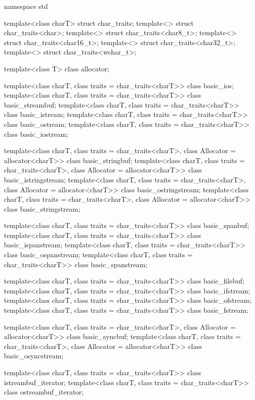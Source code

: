 \begin{codeblock}
namespace std {
  template<class charT> struct char_traits;
  template<> struct char_traits<char>;
  template<> struct char_traits<char8_t>;
  template<> struct char_traits<char16_t>;
  template<> struct char_traits<char32_t>;
  template<> struct char_traits<wchar_t>;

  template<class T> class allocator;

  template<class charT, class traits = char_traits<charT>>
    class basic_ios;
  template<class charT, class traits = char_traits<charT>>
    class basic_streambuf;
  template<class charT, class traits = char_traits<charT>>
    class basic_istream;
  template<class charT, class traits = char_traits<charT>>
    class basic_ostream;
  template<class charT, class traits = char_traits<charT>>
    class basic_iostream;

  template<class charT, class traits = char_traits<charT>,
           class Allocator = allocator<charT>>
    class basic_stringbuf;
  template<class charT, class traits = char_traits<charT>,
           class Allocator = allocator<charT>>
    class basic_istringstream;
  template<class charT, class traits = char_traits<charT>,
           class Allocator = allocator<charT>>
    class basic_ostringstream;
  template<class charT, class traits = char_traits<charT>,
           class Allocator = allocator<charT>>
    class basic_stringstream;

  template<class charT, class traits = char_traits<charT>>
    class basic_spanbuf;
  template<class charT, class traits = char_traits<charT>>
    class basic_ispanstream;
  template<class charT, class traits = char_traits<charT>>
    class basic_ospanstream;
  template<class charT, class traits = char_traits<charT>>
    class basic_spanstream;

  template<class charT, class traits = char_traits<charT>>
    class basic_filebuf;
  template<class charT, class traits = char_traits<charT>>
    class basic_ifstream;
  template<class charT, class traits = char_traits<charT>>
    class basic_ofstream;
  template<class charT, class traits = char_traits<charT>>
    class basic_fstream;

  template<class charT, class traits = char_traits<charT>,
           class Allocator = allocator<charT>>
    class basic_syncbuf;
  template<class charT, class traits = char_traits<charT>,
           class Allocator = allocator<charT>>
    class basic_osyncstream;

  template<class charT, class traits = char_traits<charT>>
    class istreambuf_iterator;
  template<class charT, class traits = char_traits<charT>>
    class ostreambuf_iterator;

}
\end{codeblock}
